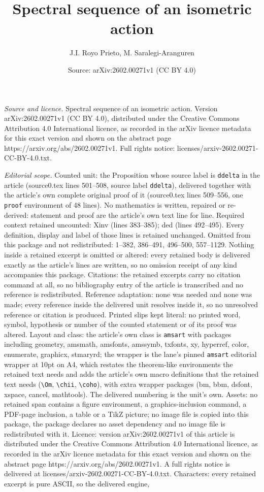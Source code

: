 \documentclass[10pt,a4paper]{amsart}
\title[Spectral sequence of an isometric action]{Spectral sequence of an isometric action}
\author{J.I. Royo Prieto, M. Saralegi-Aranguren}
\date{Source: arXiv:2602.00271v1 (CC BY 4.0)}
\begin{document}
\maketitle

\noindent\emph{Source and licence.} Spectral sequence of an isometric action. Version arXiv:2602.00271v1 (CC BY 4.0), distributed under the Creative Commons Attribution 4.0 International licence, as recorded in the arXiv licence metadata for this exact version and shown on the abstract page https://arxiv.org/abs/2602.00271v1. Full rights notice: licenses/arxiv-2602.00271-CC-BY-4.0.txt.\par\smallskip

\noindent\textit{Editorial scope.} Counted unit: the Proposition whose source label is \texttt{ddelta} in the article (source0.tex lines 501--508, source label \texttt{ddelta}), delivered together with the article's own complete original proof of it (source0.tex lines 509--556, one \texttt{proof} environment of 48 lines). No mathematics is written, repaired or re-derived: statement and proof are the article's own text line for line. Required context retained uncounted: Xinv (lines 383--385); ded (lines 492--495). Every definition, display and label of those lines is retained unchanged. Omitted from this package and not redistributed: 1--382, 386--491, 496--500, 557--1129. Nothing inside a retained excerpt is omitted or altered: every retained body is delivered exactly as the article's lines are written, so no omission receipt of any kind accompanies this package. Citations: the retained excerpts carry no citation command at all, so no bibliography entry of the article is transcribed and no reference is redistributed. Reference adaptation: none was needed and none was made; every reference inside the delivered unit resolves inside it, so no unresolved reference or citation is produced. Printed slips kept literal: no printed word, symbol, hypothesis or number of the counted statement or of its proof was altered. Layout and class: the article's own class is \texttt{amsart} with packages including geometry, amsmath, amsfonts, amssymb, txfonts, xy, hyperref, color, enumerate, graphicx, stmaryrd; the wrapper is the lane's pinned \texttt{amsart} editorial wrapper at 10pt on A4, which restates the theorem-like environments the retained text needs and adds the article's own macro definitions that the retained text needs (\texttt{\textbackslash Om}, \texttt{\textbackslash chii}, \texttt{\textbackslash coho}), with extra wrapper packages (bm, bbm, dsfont, xspace, cancel, mathtools). The delivered numbering is the unit's own. Assets: no retained span contains a figure environment, a graphics-inclusion command, a PDF-page inclusion, a table or a TikZ picture; no image file is copied into this package, the package declares no asset dependency and no image file is redistributed with it. Licence: version arXiv:2602.00271v1 of this article is distributed under the Creative Commons Attribution 4.0 International licence, as recorded in the arXiv licence metadata for this exact version and shown on the abstract page https://arxiv.org/abs/2602.00271v1. A full rights notice is delivered at licenses/arxiv-2602.00271-CC-BY-4.0.txt. Characters: every retained excerpt is pure ASCII, so the delivered engine, 
\end{document}
